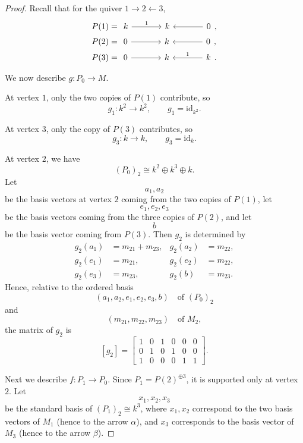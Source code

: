 \documentclass[11pt, a4paper]{report}
\begin{document}
\begin{example}
\begin{proof}
Recall that for the quiver \(1\to 2 \leftarrow 3\),
\begin{align*}
P(1)&=
\begin{tikzcd}[ampersand replacement=\&, column sep=large]
k \arrow[r,"1"] \& k \& 0 \arrow[l]
\end{tikzcd},\\
P(2)&=
\begin{tikzcd}[ampersand replacement=\&, column sep=large]
0 \arrow[r] \& k \& 0 \arrow[l]
\end{tikzcd},\\
P(3)&=
\begin{tikzcd}[ampersand replacement=\&, column sep=large]
0 \arrow[r] \& k \& k \arrow[l,"1"']
\end{tikzcd}.
\end{align*}

We now describe \(g:P_0\to M\).

At vertex \(1\), only the two copies of \(P(1)\) contribute, so
\[
g_1:k^2\longrightarrow k^2,\qquad g_1=\mathrm{id}_{k^2}.
\]

At vertex \(3\), only the copy of \(P(3)\) contributes, so
\[
g_3:k\longrightarrow k,\qquad g_3=\mathrm{id}_k.
\]

At vertex \(2\), we have
\[
(P_0)_2 \cong k^2\oplus k^3\oplus k.
\]
Let
\[
a_1,a_2
\]
be the basis vectors at vertex \(2\) coming from the two copies of \(P(1)\),
let
\[
e_1,e_2,e_3
\]
be the basis vectors coming from the three copies of \(P(2)\),
and let
\[
b
\]
be the basis vector coming from \(P(3)\). Then \(g_2\) is determined by
\[
\begin{aligned}
g_2(a_1)&=m_{21}+m_{23}, &
g_2(a_2)&=m_{22},\\
g_2(e_1)&=m_{21}, &
g_2(e_2)&=m_{22},\\
g_2(e_3)&=m_{23}, &
g_2(b)&=m_{23}.
\end{aligned}
\]
Hence, relative to the ordered basis
\[
(a_1,a_2,e_1,e_2,e_3,b)
\quad\text{of }(P_0)_2
\]
and
\[
(m_{21},m_{22},m_{23})
\quad\text{of }M_2,
\]
the matrix of \(g_2\) is
\[
[g_2]=
\begin{bmatrix}
1&0&1&0&0&0\\
0&1&0&1&0&0\\
1&0&0&0&1&1
\end{bmatrix}.
\]

\medskip

Next we describe \(f:P_1\to P_0\). Since \(P_1=P(2)^{\oplus 3}\), it is supported only at
vertex \(2\). Let
\[
x_1,x_2,x_3
\]
be the standard basis of \((P_1)_2\cong k^3\), where \(x_1,x_2\) correspond to the two basis
vectors of \(M_1\) (hence to the arrow \(\alpha\)), and \(x_3\) corresponds to the basis vector
of \(M_3\) (hence to the arrow \(\beta\)).


\end{proof}
\end{example}
\end{document}

